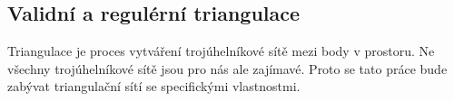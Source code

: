 \documentclass[12pt,a4paper]{article}
\begin{document}
{%
\begin{figure}[h!]
\centering
\begin{floatrow}
\end{floatrow}
\end{figure}

\newpage
\subsection{Validní a regulérní triangulace}

Triangulace je proces vytváření trojúhelníkové
sítě mezi body v prostoru. Ne všechny trojúhelníkové sítě jsou pro nás ale zajímavé. Proto se tato práce bude zabývat triangulační
sítí se specifickými vlastnostmi.

}
\end{document}
